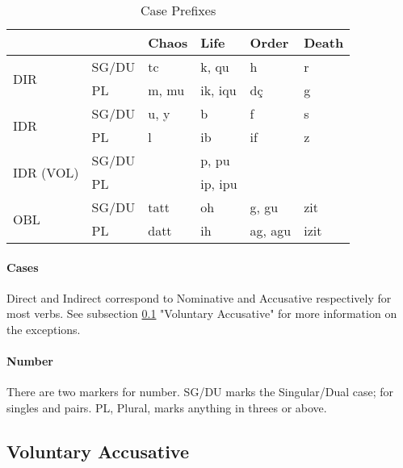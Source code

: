 \documentclass[11pt]{article}
\begin{document}
\begin{table}[H]
\begin{center}
\caption{Case Prefixes}
\label{table-cases}
\begin{tabular}{llllll}
                            &           & \textbf{Chaos} & \textbf{Life} & \textbf{Order} & \textbf{Death} \\
\hline\hline
\multirow{2}{*}{DIR}        & SG/DU     & tc             & k, qu         & h              & r              \\
                            & PL        & m, mu          & ik, iqu       & dç             & g              \\
\hline
\multirow{2}{*}{IDR}                 & SG/DU     & u, y           & b             & f              & s              \\
                            & PL        & l              & ib            & if             & z              \\
\hline
\multirow{2}{*}{IDR (VOL)}  & SG/DU     &                & p, pu         &                &                \\
                            & PL        &                & ip, ipu       &                &                \\
\hline
\multirow{2}{*}{OBL}        & SG/DU     & tatt           & oh            & g, gu          & zit            \\
                            & PL        & datt           & ih            & ag, agu        & izit          
\end{tabular}
\end{center}
\end{table}

\paragraph{Cases}
Direct and Indirect correspond to Nominative and Accusative respectively for most verbs.
See subsection \ref{sec:voluntary} "Voluntary Accusative" for more information on the exceptions.

\paragraph{Number}
There are two markers for number. SG/DU marks the Singular/Dual case;
for singles and pairs. PL, Plural, marks anything in threes or above.

\newpage

\subsection{Voluntary Accusative} \label{sec:voluntary}
\end{document}
